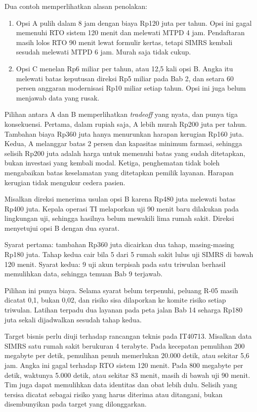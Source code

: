 Dua contoh memperlihatkan alasan penolakan:
\begin{enumerate}
  \item Opsi A pulih dalam 8 jam dengan biaya Rp120 juta per tahun. Opsi ini gagal memenuhi RTO
  sistem 120 menit dan melewati MTPD 4 jam. Pendaftaran masih lolos RTO 90 menit lewat formulir
  kertas, tetapi SIMRS kembali sesudah melewati MTPD 6 jam. Murah saja tidak cukup.
  \item Opsi C menelan Rp6 miliar per tahun, atau 12,5 kali opsi B. Angka itu melewati batas
  keputusan direksi Rp5 miliar pada Bab 2, dan setara 60 persen anggaran modernisasi Rp10 miliar
  setiap tahun. Opsi ini juga belum menjawab data yang rusak.
\end{enumerate}

Pilihan antara A dan B memperlihatkan \textit{tradeoff} yang nyata, dan punya tiga konsekuensi.
Pertama, dalam rupiah saja, A lebih murah Rp200 juta per tahun. Tambahan biaya Rp360 juta hanya
menurunkan harapan kerugian Rp160 juta. Kedua, A melanggar batas 2 persen dan kapasitas minimum
farmasi, sehingga selisih Rp200 juta adalah harga untuk memenuhi batas yang sudah ditetapkan, bukan
investasi yang kembali modal. Ketiga, penghematan tidak boleh mengabaikan batas keselamatan yang
ditetapkan pemilik layanan. Harapan kerugian tidak mengukur cedera pasien.

\begin{kasus}[title={Kasus Medikara Health: Persetujuan Bersyarat atas Opsi B}]
Misalkan direksi menerima usulan opsi B karena Rp480 juta melewati batas Rp400 juta. Kepala operasi
TI melaporkan uji 90 menit baru dilakukan pada lingkungan uji, sehingga hasilnya belum mewakili lima
rumah sakit. Direksi menyetujui opsi B dengan dua syarat.

Syarat pertama: tambahan Rp360 juta dicairkan dua tahap, masing-masing Rp180 juta. Tahap kedua cair
bila 5 dari 5 rumah sakit lulus uji SIMRS di bawah 120 menit. Syarat kedua: 9 uji akun terpisah pada
satu triwulan berhasil memulihkan data, sehingga temuan Bab 9 terjawab.

Pilihan ini punya biaya. Selama syarat belum terpenuhi, peluang R-05 masih dicatat 0,1, bukan 0,02,
dan risiko sisa dilaporkan ke komite risiko setiap triwulan. Latihan terpadu dua layanan pada peta
jalan Bab 14 seharga Rp180 juta sekali dijadwalkan sesudah tahap kedua.
\end{kasus}

\begin{pendalaman}
Target bisnis perlu diuji terhadap rancangan teknis pada IT40713. Misalkan data SIMRS satu rumah
sakit berukuran 4 terabyte. Pada kecepatan pemulihan 200 megabyte per detik, pemulihan penuh
memerlukan 20.000 detik, atau sekitar 5,6 jam. Angka ini gagal terhadap RTO sistem 120 menit. Pada
800 megabyte per detik, waktunya 5.000 detik, atau sekitar 83 menit, masih di bawah uji 90 menit.
Tim juga dapat memulihkan data identitas dan obat lebih dulu. Selisih yang tersisa dicatat sebagai
risiko yang harus diterima atau ditangani, bukan disembunyikan pada target yang dilonggarkan.
\end{pendalaman}

